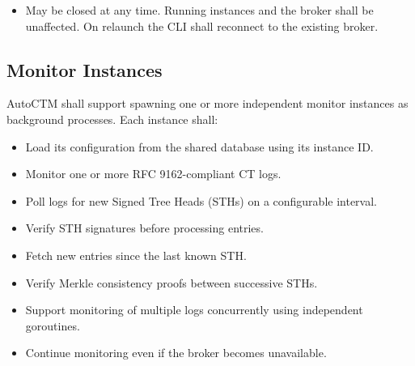 \documentclass{article}
\begin{document}
\begin{itemize}
\begin{itemize}
\item \texttt{/status} --- Display the instance's current status.

\item \texttt{/shutdown} --- Shut down the active instance only.

\item \texttt{/clear-instance} --- Return to global context.

\end{itemize}

\item May be closed at any time. Running instances and the broker shall be 
unaffected. On relaunch the CLI shall reconnect to the existing broker.

\end{itemize}

\subsection{Monitor Instances}

AutoCTM shall support spawning one or more independent monitor instances as 
background processes. Each instance shall:

\begin{itemize}

\item Load its configuration from the shared database using its instance ID.

\item Monitor one or more RFC 9162-compliant CT logs.

\item Poll logs for new Signed Tree Heads (STHs) on a configurable interval.

\item Verify STH signatures before processing entries.

\item Fetch new entries since the last known STH.

\item Verify Merkle consistency proofs between successive STHs.

\item Support monitoring of multiple logs concurrently using independent 
goroutines.

\item Continue monitoring even if the broker becomes unavailable.

\end{itemize}
\end{document}
